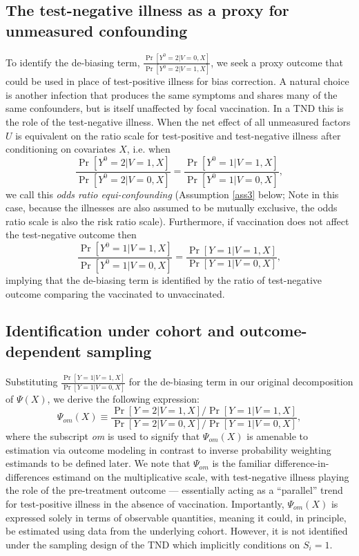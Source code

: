 \documentclass[11pt]{article}
\begin{document}
\subsection*{The test-negative illness as a proxy for unmeasured confounding}
To identify the de-biasing term, $\frac{\Pr[Y^0 = 2 | V = 0, X]}{\Pr[Y^0 = 2 | V = 1, X]}$, we seek a proxy outcome that could be used in place of test-positive illness for bias correction. A natural choice is another infection that produces the same symptoms and shares many of the same confounders, but is itself unaffected by focal vaccination. In a TND this is the role of the test-negative illness. When the net effect of all unmeasured factors $U$ is equivalent on the ratio scale for test-positive and test-negative illness after conditioning on covariates $X$, i.e. when
\begin{equation}\label{eqn:proxy}
     \dfrac{\Pr[Y^0 = 2  | V = 1, X]}{\Pr[Y^0 = 2 | V = 0, X]} = \frac{\Pr[Y^0 = 1 | V = 1, X]}{\Pr[Y^0 = 1 | V = 0, X]},
\end{equation}
we call this \textit{odds ratio equi-confounding} (Assumption \ref{ass3} below; Note in this case, because the illnesses are also assumed to be mutually exclusive, the odds ratio scale is also the risk ratio scale). Furthermore, if vaccination does not affect the test-negative outcome then 
\begin{equation}\label{eqn:no_effect}
     \frac{\Pr[Y^0 = 1 | V = 1, X]}{\Pr[Y^0 = 1 | V = 0, X]} = \frac{\Pr[Y = 1 | V = 1, X]}{\Pr[Y = 1 | V = 0, X]},
\end{equation}
implying that the de-biasing term is identified by the ratio of test-negative outcome comparing the vaccinated to unvaccinated.

\subsection*{Identification under cohort and outcome-dependent sampling}
Substituting $\frac{\Pr[Y = 1 | V = 1, X]}{\Pr[Y = 1 | V = 0, X]}$ for the de-biasing term in our original decomposition of $\Psi(X)$, we derive the following expression:
    \begin{equation}\label{eqn:or_estimand}
         \Psi_{om}(X) \equiv \dfrac{\Pr[Y = 2 | V = 1, X]/\Pr[Y = 1 | V = 1, X]}{\Pr[Y = 2 | V = 0, X]/\Pr[Y = 1 | V = 0, X]},
    \end{equation}
where the subscript \textit{om} is used to signify that $\Psi_{om}(X)$ is amenable to estimation via outcome modeling in contrast to inverse probability weighting estimands to be defined later. We note that $\Psi_{om}$ is the familiar difference-in-differences estimand on the multiplicative scale, with test-negative illness playing the role of the pre-treatment outcome --- essentially acting as a ``parallel'' trend for test-positive illness in the absence of vaccination. Importantly, $\Psi_{om}(X)$ is expressed solely in terms of observable quantities, meaning it could, in principle, be estimated using data from the underlying cohort. However, it is not identified under the sampling design of the TND which implicitly conditions on $S_i = 1$. 
\end{document}
